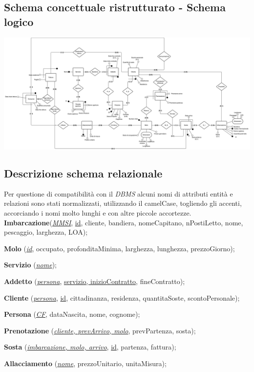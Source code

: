 \subsection{Schema concettuale ristrutturato - Schema logico}
\includegraphics[width=\textwidth]{img/erlogico.png}


\subsection{Descrizione schema relazionale}

Per questione di compatibilità con il \textit{DBMS} alcuni nomi di attributi entità e relazioni sono stati normalizzati, utilizzando il camelCase, togliendo gli accenti, accorciando i nomi molto lunghi e con altre piccole accortezze.\\

\textbf{Imbarcazione}(\underline{\textit{MMSI}}, \underline{id}, cliente, bandiera, nomeCapitano, nPostiLetto, nome, pescaggio, larghezza, LOA);

\textbf{Molo} (\underline{\textit{id}}, occupato, profonditaMinima, larghezza, lunghezza, prezzoGiorno);

\textbf{Servizio} (\underline{\textit{nome}});

\textbf{Addetto} (\underline{\textit{persona}}, \underline{servizio, inizioContratto}, fineContratto);

\textbf{Cliente} (\underline{\textit{persona}}, \underline{id}, cittadinanza, residenza, quantitaSoste, scontoPersonale);

\textbf{Persona} (\underline{\textit{CF}}, dataNascita, nome, cognome);

\textbf{Prenotazione} (\underline{\textit{cliente, prevArrivo, molo}}, prevPartenza, sosta);

\textbf{Sosta} (\underline{\textit{imbarcazione, molo, arrivo}}, \underline{id}, partenza, fattura);

\textbf{Allacciamento} (\underline{\textit{nome}}, prezzoUnitario, unitaMisura);

